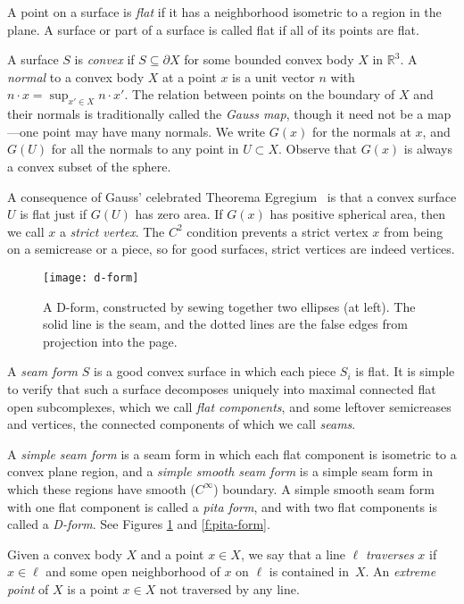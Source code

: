 \documentclass{article}
\newcommand\term[1]{{\it #1}}
\newcommand\R{\mathbb R}
\newcommand\bdy\partial
\begin{document}
A point on a surface is \term{flat} if it has a neighborhood isometric
to a region in the plane.  A surface or part of a surface is called
flat if all of its points are flat.

A surface $S$ is \term{convex} if $S \subseteq \bdy X$ for some bounded
convex body $X$ in $\R^3$.
A \term{normal} to a convex
body $X$ at a point $x$ is a unit vector $n$ with $n \cdot x =
\sup_{x' \in X} n\cdot x'$.
The relation between points on the boundary of $X$ and their normals
is traditionally called the \term{Gauss map}, though it need not be a
map---one point may have many normals.  We write $G(x)$ for the
normals at $x$, and $G(U)$ for all the normals to any point in $U
\subset X$.  Observe that $G(x)$ is always a convex subset of the sphere.

A consequence of Gauss' celebrated Theorema Egregium~\cite{Gauss}
is that a convex surface $U$ is flat just if $G(U)$ has zero area.
If $G(x)$ has positive spherical area, then we call $x$ a \term{strict
  vertex}.  The $C^2$ condition prevents a strict vertex $x$ from being
on a semicrease or a piece, so for good surfaces, strict vertices
are indeed vertices.

\begin{figure}[tb]
  \centering
  \texttt{[image: d-form]}
  \caption{A D-form, constructed by sewing together two ellipses (at
    left).  The solid line is the seam, and the dotted lines are
    the false edges from projection into the page.}
  \label{f:d-form}
\end{figure}

A \term{seam form} $S$ is a good convex surface in which each piece
$S_i$ is flat.  It is simple to verify that such a surface decomposes
uniquely into maximal connected flat open subcomplexes, which we call
\term{flat components}, and some leftover semicreases and vertices,
the connected components of which we call \term{seams}.

A \term{simple seam form} is a seam form in which each flat component
is isometric to a convex plane region, and a \term{simple smooth seam
  form} is a simple seam form in which these regions have smooth
($C^\infty$) boundary.
A simple smooth seam form with one flat component is called a \term{pita
  form}, and with two flat components is called a \term{D-form}.
See Figures \ref{f:d-form} and \ref{f:pita-form}.

Given a convex body $X$ and a point $x
\in X$, we say that a line $\ell$ \term{traverses} $x$ if $x \in \ell$
and some open neighborhood of $x$ on $\ell$ is contained in~$X$.  An
\term{extreme point} of $X$ is a point $x \in X$ not traversed by any
line.
\end{document}
